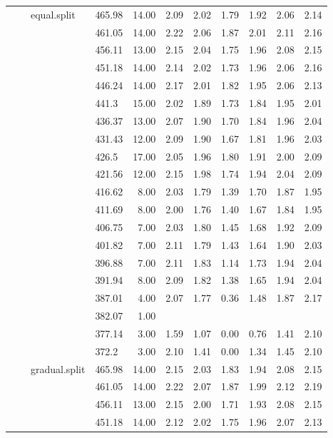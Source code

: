 \begin{longtable}{llllrrrrrrr}
   &  & equal.split & 465.98 & 14.00 & 2.09 & 2.02 & 1.79 & 1.92 & 2.06 & 2.14 \\ 
   &  &  & 461.05 & 14.00 & 2.22 & 2.06 & 1.87 & 2.01 & 2.11 & 2.16 \\ 
   &  &  & 456.11 & 13.00 & 2.15 & 2.04 & 1.75 & 1.96 & 2.08 & 2.15 \\ 
   &  &  & 451.18 & 14.00 & 2.14 & 2.02 & 1.73 & 1.96 & 2.06 & 2.16 \\ 
   &  &  & 446.24 & 14.00 & 2.17 & 2.01 & 1.82 & 1.95 & 2.06 & 2.13 \\ 
   &  &  & 441.3 & 15.00 & 2.02 & 1.89 & 1.73 & 1.84 & 1.95 & 2.01 \\ 
   &  &  & 436.37 & 13.00 & 2.07 & 1.90 & 1.70 & 1.84 & 1.96 & 2.04 \\ 
   &  &  & 431.43 & 12.00 & 2.09 & 1.90 & 1.67 & 1.81 & 1.96 & 2.03 \\ 
   &  &  & 426.5 & 17.00 & 2.05 & 1.96 & 1.80 & 1.91 & 2.00 & 2.09 \\ 
   &  &  & 421.56 & 12.00 & 2.15 & 1.98 & 1.74 & 1.94 & 2.04 & 2.09 \\ 
   &  &  & 416.62 & 8.00 & 2.03 & 1.79 & 1.39 & 1.70 & 1.87 & 1.95 \\ 
   &  &  & 411.69 & 8.00 & 2.00 & 1.76 & 1.40 & 1.67 & 1.84 & 1.95 \\ 
   &  &  & 406.75 & 7.00 & 2.03 & 1.80 & 1.45 & 1.68 & 1.92 & 2.09 \\ 
   &  &  & 401.82 & 7.00 & 2.11 & 1.79 & 1.43 & 1.64 & 1.90 & 2.03 \\ 
   &  &  & 396.88 & 7.00 & 2.11 & 1.83 & 1.14 & 1.73 & 1.94 & 2.04 \\ 
   &  &  & 391.94 & 8.00 & 2.09 & 1.82 & 1.38 & 1.65 & 1.94 & 2.04 \\ 
   &  &  & 387.01 & 4.00 & 2.07 & 1.77 & 0.36 & 1.48 & 1.87 & 2.17 \\ 
   &  &  & 382.07 & 1.00 &  &  &  &  &  &  \\ 
   &  &  & 377.14 & 3.00 & 1.59 & 1.07 & 0.00 & 0.76 & 1.41 & 2.10 \\ 
   &  &  & 372.2 & 3.00 & 2.10 & 1.41 & 0.00 & 1.34 & 1.45 & 2.10 \\ 
   &  & gradual.split & 465.98 & 14.00 & 2.15 & 2.03 & 1.83 & 1.94 & 2.08 & 2.15 \\ 
   &  &  & 461.05 & 14.00 & 2.22 & 2.07 & 1.87 & 1.99 & 2.12 & 2.19 \\ 
   &  &  & 456.11 & 13.00 & 2.15 & 2.00 & 1.71 & 1.93 & 2.08 & 2.15 \\ 
   &  &  & 451.18 & 14.00 & 2.12 & 2.02 & 1.75 & 1.96 & 2.07 & 2.13 \\ 

\end{longtable}
